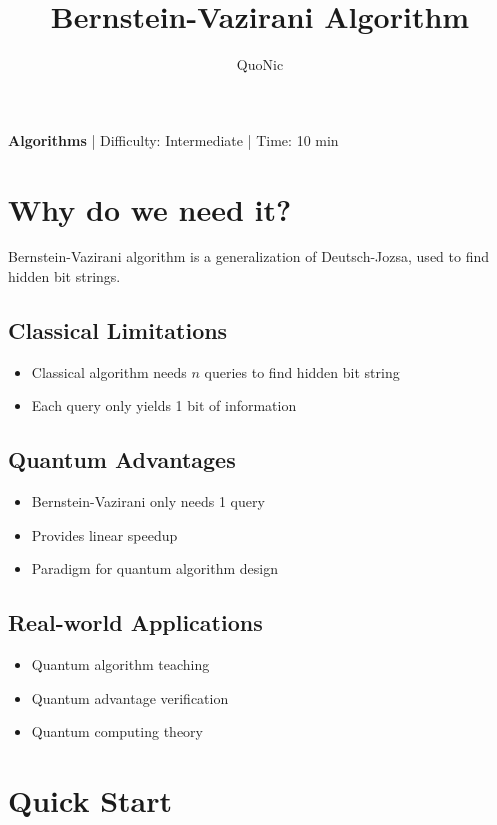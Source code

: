 \documentclass[12pt,a4paper]{article}
\title{Bernstein-Vazirani Algorithm}
\author{QuoNic}
\date{}
\begin{document}
\maketitle

\begin{center}
\textbf{Algorithms} | Difficulty: Intermediate | Time: 10 min
\end{center}

\tableofcontents
\newpage

\section{Why do we need it?}

Bernstein-Vazirani algorithm is a generalization of Deutsch-Jozsa, used to find hidden bit strings.

\subsection{Classical Limitations}
\begin{itemize}
  \item Classical algorithm needs $n$ queries to find hidden bit string
  \item Each query only yields 1 bit of information
\end{itemize}

\subsection{Quantum Advantages}
\begin{itemize}
  \item Bernstein-Vazirani only needs 1 query
  \item Provides linear speedup
  \item Paradigm for quantum algorithm design
\end{itemize}

\subsection{Real-world Applications}
\begin{itemize}
  \item Quantum algorithm teaching
  \item Quantum advantage verification
  \item Quantum computing theory
\end{itemize}

\section{Quick Start}
\end{document}
